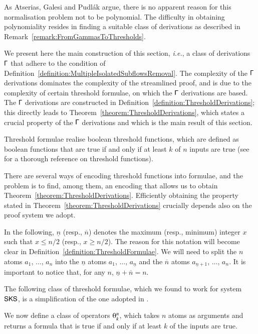 As Atserias, Galesi and Pudl\'ak argue, there is no apparent reason for this normalisation problem not to be polynomial. The difficulty in obtaining polynomiality resides in finding a suitable class of derivations as described in Remark~\vref{remark:FromGammasToThresholds}.

We present here the main construction of this section, \emph{i.e.}, a class of derivations $\mathsf\Gamma$ that adhere to the condition of Definition~\vref{definition:MultipleIsolatedSubflowsRemoval}. The complexity of the $\mathsf\Gamma$ derivations dominates the complexity of the streamlined proof, and is due to the complexity of certain threshold formulae, on which the $\mathsf\Gamma$ derivations are based. The $\mathsf\Gamma$ derivations are constructed in Definition~\vref{definition:ThresholdDerivations}; this directly leads to Theorem~\vref{theorem:ThresholdDerivations}, which states a crucial property of the $\mathsf\Gamma$ derivations and which is the main result of this section.

Threshold formulae realise boolean threshold functions, which are defined as boolean functions that are true if and only if at least $k$ of $n$ inputs are true (see \cite{Wege:87:The-Comp:vn} for a thorough reference on threshold functions).

There are several ways of encoding threshold functions into formulae, and the problem is to find, among them, an encoding that allows us to obtain Theorem~\vref{theorem:ThresholdDerivations}. Efficiently obtaining the property stated in Theorem~\ref{theorem:ThresholdDerivations} crucially depends also on the proof system we adopt.

In the following, $\underline  n$ (resp., $\overline  n$) denotes the maximum (resp., minimum) integer $x$ such that $x\le n/2$ (resp., $x\ge n/2$). The reason for this notation will become clear in Definition~\vref{definition:ThresholdFormulae}. We will need to split the $n$ atoms $a_1$, $\dots$, $a_n$ into the $\underline  n$ atoms $a_1$, $\dots$, $a_{\underline  n}$ and the $\overline  n$ atoms $a_{\underline  n+1}$, $\dots$, $a_n$. It is important to notice that, for any $n$, $\underline n+\overline n=n$.

The following class of threshold formulae, which we found to work for system $\mathsf{SKS}$, is a simplification of the one adopted in \cite{AtseGalePudl:02:Monotone:yu}.

\newcommand{\avec}[2]{(a_{#1},\dots,a_{#2})}
\renewcommand{\th}[2]{\mathop{\thetaup_{#1}^{#2}}}

We now define a class of operators $\th kn$, which takes $n$ atoms as arguments and returns a formula that is true if and only if at least $k$ of the inputs are true.

